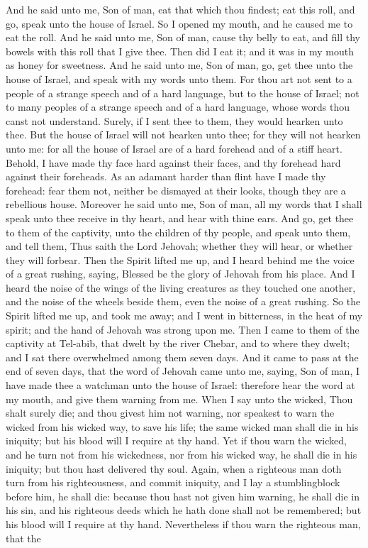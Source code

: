 And he said unto me, Son of man, eat that which thou findest; eat this roll, and go, speak unto the house of Israel. So I opened my mouth, and he caused me to eat the roll. And he said unto me, Son of man, cause thy belly to eat, and fill thy bowels with this roll that I give thee. Then did I eat it; and it was in my mouth as honey for sweetness.  And he said unto me, Son of man, go, get thee unto the house of Israel, and speak with my words unto them. For thou art not sent to a people of a strange speech and of a hard language, but to the house of Israel; not to many peoples of a strange speech and of a hard language, whose words thou canst not understand. Surely, if I sent thee to them, they would hearken unto thee. But the house of Israel will not hearken unto thee; for they will not hearken unto me: for all the house of Israel are of a hard forehead and of a stiff heart. Behold, I have made thy face hard against their faces, and thy forehead hard against their foreheads. As an adamant harder than flint have I made thy forehead: fear them not, neither be dismayed at their looks, though they are a rebellious house. Moreover he said unto me, Son of man, all my words that I shall speak unto thee receive in thy heart, and hear with thine ears. And go, get thee to them of the captivity, unto the children of thy people, and speak unto them, and tell them, Thus saith the Lord Jehovah; whether they will hear, or whether they will forbear.  Then the Spirit lifted me up, and I heard behind me the voice of a great rushing, saying, Blessed be the glory of Jehovah from his place. And I heard the noise of the wings of the living creatures as they touched one another, and the noise of the wheels beside them, even the noise of a great rushing. So the Spirit lifted me up, and took me away; and I went in bitterness, in the heat of my spirit; and the hand of Jehovah was strong upon me. Then I came to them of the captivity at Tel-abib, that dwelt by the river Chebar, and to where they dwelt; and I sat there overwhelmed among them seven days.  And it came to pass at the end of seven days, that the word of Jehovah came unto me, saying, Son of man, I have made thee a watchman unto the house of Israel: therefore hear the word at my mouth, and give them warning from me. When I say unto the wicked, Thou shalt surely die; and thou givest him not warning, nor speakest to warn the wicked from his wicked way, to save his life; the same wicked man shall die in his iniquity; but his blood will I require at thy hand. Yet if thou warn the wicked, and he turn not from his wickedness, nor from his wicked way, he shall die in his iniquity; but thou hast delivered thy soul. Again, when a righteous man doth turn from his righteousness, and commit iniquity, and I lay a stumblingblock before him, he shall die: because thou hast not given him warning, he shall die in his sin, and his righteous deeds which he hath done shall not be remembered; but his blood will I require at thy hand. Nevertheless if thou warn the righteous man, that the 